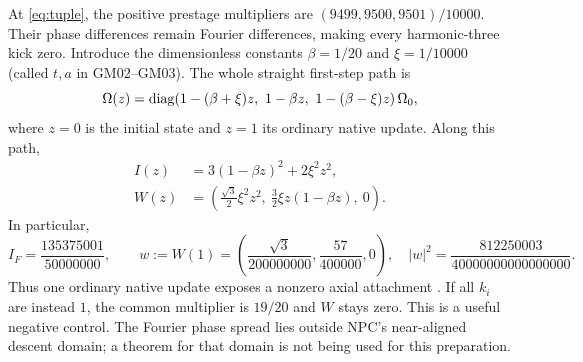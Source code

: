 At \eqref{eq:tuple}, the positive prestage multipliers are
\((9499,9500,9501)/10000\). Their phase differences remain Fourier differences, making every harmonic-three kick zero. Introduce the dimensionless constants
\(\beta=1/20\) and \(\xi=1/10000\) (called \(t,a\) in GM02--GM03). The whole straight first-step path is
\begin{equation}
 \Om(z)=\diag\!\left(1-(\beta+\xi)z,\ 1-\beta z,\ 1-(\beta-\xi)z\right)\Om_0,
 \label{eq:path}
\end{equation}
where \(z=0\) is the initial state and \(z=1\) its ordinary native update. Along this path,
\begin{align}
 I(z)&=3(1-\beta z)^2+2\xi^2z^2, \label{eq:path-I}\\
 W(z)&=\left(\frac{\sqrt3}{2}\xi^2z^2,\ \frac32\xi z(1-\beta z),\ 0\right). \label{eq:path-W}
\end{align}
In particular,
\begin{equation}
 I_F=\frac{135375001}{50000000},\qquad
 w:=W(1)=\left(\frac{\sqrt3}{200000000},\frac{57}{400000},0\right),
 \quad |w|^2=\frac{812250003}{40000000000000000}.
 \label{eq:endpoint}
\end{equation}
Thus one ordinary native update exposes a nonzero axial attachment \cite{GM02}. If all \(k_i\) are instead \(1\), the common multiplier is \(19/20\) and \(W\) stays zero. This is a useful negative control. The Fourier phase spread lies outside NPC's near-aligned descent domain; a theorem for that domain is not being used for this preparation.
